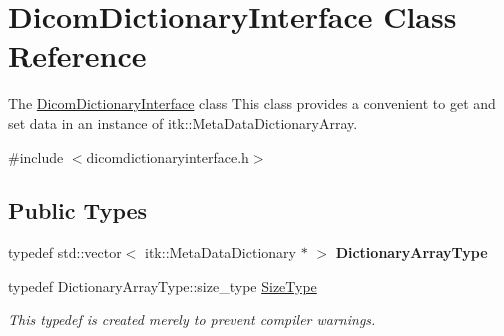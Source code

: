 \hypertarget{class_dicom_dictionary_interface}{}\section{Dicom\+Dictionary\+Interface Class Reference}
\label{class_dicom_dictionary_interface}


The \hyperlink{class_dicom_dictionary_interface}{Dicom\+Dictionary\+Interface} class This class provides a convenient to get and set data in an instance of itk\+::\+Meta\+Data\+Dictionary\+Array.  




{\ttfamily \#include $<$dicomdictionaryinterface.\+h$>$}

\subsection*{Public Types}
\begin{DoxyCompactItemize}
\item 
\mbox{\label{class_dicom_dictionary_interface_a9fa034992ec9eadd94f1258c2b4458e4}} 
typedef std\+::vector$<$ itk\+::\+Meta\+Data\+Dictionary $\ast$ $>$ {\bfseries Dictionary\+Array\+Type}
\item 
typedef Dictionary\+Array\+Type\+::size\+\_\+type \hyperlink{class_dicom_dictionary_interface_a4fde43e0647ab57f29eb2c59c3d051ca}{Size\+Type}
\begin{DoxyCompactList}\small\item\em This typedef is created merely to prevent compiler warnings. \end{DoxyCompactList}\end{DoxyCompactItemize}
